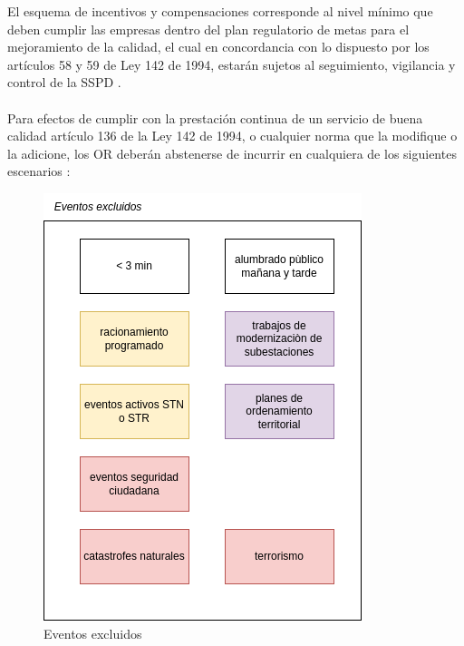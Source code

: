 \documentclass[a5paper]{book}%
\begin{document}
    El esquema de incentivos y compensaciones corresponde al nivel mínimo que deben cumplir las empresas dentro del plan regulatorio de metas para el mejoramiento de la calidad, el cual en concordancia con lo dispuesto por los artículos 58 y 59 de Ley 142 de 1994, estarán sujetos al seguimiento, vigilancia y control de la SSPD \cite{CREG0152018}.\\\\
    Para efectos de cumplir con la prestación continua de un servicio de buena calidad artículo 136 de la Ley 142 de 1994, o cualquier norma que la modifique o la adicione, los OR deberán abstenerse de incurrir en cualquiera de los siguientes escenarios \cite{CREG0152018}:

    \begin{figure}[H]
      \centering
      \caption{Eventos excluidos}
      \label{fig:excluidos}
      \includegraphics[width=\linewidth]{exclusiones_sdl}
    \end{figure}
\end{document}
